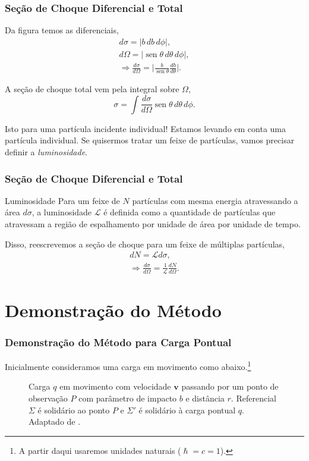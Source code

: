 \documentclass[xcolor=dvipsnames]{beamer}
\DeclareMathOperator*{\sen}{sen}
\renewcommand{\vec}{\mathbf}
\begin{document}
\begin{frame}
	\frametitle{Seção de Choque Diferencial e Total}
	Da figura temos as diferenciais,
	\begin{gather}
		d\sigma = |b\, db\, d\phi|,\\
		d\Omega = |\sen \theta \, d\theta \, d\phi|, \\ \Rightarrow
		\frac{d\sigma}{d\Omega} = \bigg| \frac{b}{\sen \theta}
		\frac{db}{d\theta} \bigg|. \label{diff_cross_section}
	\end{gather}

	A seção de choque total vem pela integral sobre $\Omega$,
	\begin{equation}
		\sigma = \int \frac{d\sigma}{d\Omega} \sen \theta \, d\theta \, d\phi .
	\end{equation}
	\begin{block}{Isto para uma partícula incidente individual!}
		Estamos levando em conta uma partícula individual. Se quisermos tratar
		um feixe de partículas, vamos precisar definir a \textit{luminosidade}.
	\end{block}

\end{frame}

\begin{frame}
	\frametitle{Seção de Choque Diferencial e Total}
	\begin{block}{Luminosidade}
		Para um feixe de $N$ partículas com mesma energia atravessando a área
		$d\sigma$, a luminosidade $\mathcal{L}$ é definida como a quantidade
		de partículas que atravessam a região de espalhamento por unidade de
		área por unidade de tempo.
	\end{block}
	Disso, reescrevemos a seção de choque para um feixe de múltiplas partículas,
	\begin{gather}
		dN = \mathcal{L} d\sigma, \\
		\Rightarrow \frac{d\sigma}{d\Omega} = \frac{1}{\mathcal{L}}
		\frac{dN}{d\Omega}.
	\end{gather}
\end{frame}

\section{Demonstração do Método}
\begin{frame}
	\frametitle{Demonstração do Método para Carga Pontual}
	Inicialmente consideramos uma carga em movimento como abaixo.\footnote{A
	partir daqui usaremos unidades naturais ($\hslash = c = 1$).}
	\begin{figure}
	
	\caption{Carga $q$ em movimento com velocidade $\vec{v}$ passando por um
		ponto de observação $P$ com parâmetro de impacto $b$ e distância $r$.
		Referencial $\Sigma$ é solidário ao ponto $P$ e $\Sigma '$ é solidário
		à carga pontual $q$. Adaptado de \cite{jackson3}.}
	\end{figure}
\end{frame}
\end{document}
